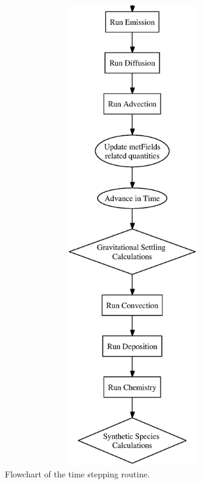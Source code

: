 %
\begin{figure}[hbtp]
\centering                                             %
\includegraphics[height=7.95in,width=6.50in]{gmiSteppingFlowchart.ps}
\caption{Flowchart of the time stepping routine.}
\label{fig:step}
\end{figure}

